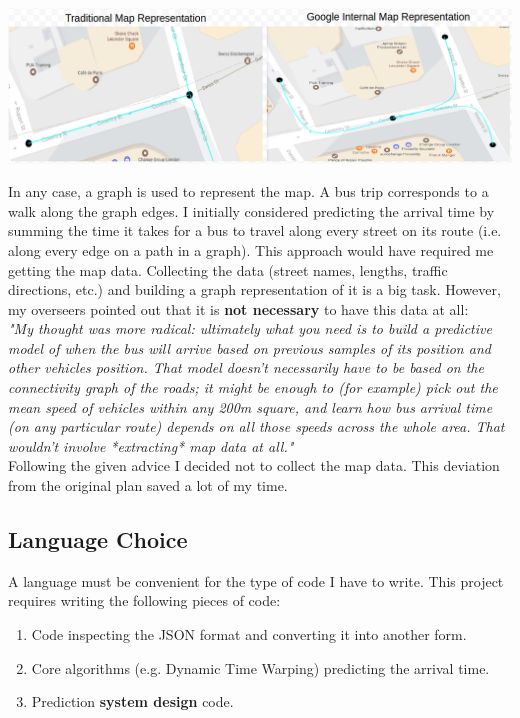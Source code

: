 \documentclass[12pt,a4paper,oneside,openright]{report}
\begin{document}
\includegraphics[width=\textwidth]{figs/google.png}

In any case, a graph is used to represent the map. A bus trip corresponds to a walk
along the graph edges. I initially considered predicting the arrival time by summing the
time it takes for a bus to travel along every street on its route (i.e. along every edge on
a path in a graph). This approach would have required
me getting the map data. Collecting the data (street names, lengths, traffic directions, etc.)
and building a graph representation of it is a big task. However, my overseers pointed out
that it is \textbf{not necessary} to have this data at all: \\

\textit{"My thought was more radical: ultimately what you need is to build a predictive
 model of when the bus will arrive based on previous samples of its position and other
 vehicles position. That model doesn't necessarily have to be based on the connectivity
 graph of the roads; it might be enough to (for example) pick out the mean speed of
 vehicles within any 200m square, and learn how bus arrival time (on any particular route)
 depends on all those speeds across the whole area. That wouldn't involve *extracting* map
 data at all."} \\

Following the given advice I decided not to collect the map data. This deviation from the
original plan saved a lot of my time.

\subsection{Language Choice}

A language must be convenient for the type of code I have to write. This project requires writing
the following pieces of code:

\begin{enumerate}
\item Code inspecting the JSON format and converting it into another form.
\item Core algorithms (e.g. Dynamic Time Warping) predicting the arrival time.
\item Prediction \textbf{system design} code.
\end{enumerate}
\end{document}
